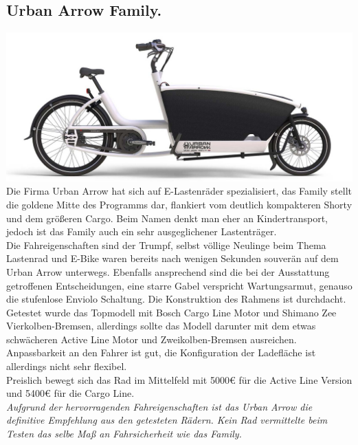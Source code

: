 \documentclass[a4paper,ngerman, 14pt] {scrartcl}
\begin{document}
\subsection{Urban Arrow Family.}
\includegraphics[scale=0.325]{urban_arrow_family.png}\\
Die Firma Urban Arrow hat sich auf E-Lastenräder spezialisiert, das Family stellt die goldene Mitte des Programms dar, flankiert vom deutlich kompakteren Shorty und dem größeren Cargo. Beim Namen denkt man eher an Kindertransport, jedoch ist das Family auch ein sehr ausgeglichener Lastenträger.\\
Die Fahreigenschaften sind der Trumpf, selbst völlige Neulinge beim Thema Lastenrad und E-Bike waren bereits nach wenigen Sekunden souverän auf dem Urban Arrow unterwegs. Ebenfalls ansprechend sind die bei der Ausstattung getroffenen Entscheidungen, eine starre Gabel verspricht Wartungsarmut, genauso die stufenlose Enviolo Schaltung. Die Konstruktion des Rahmens ist durchdacht.\\
Getestet wurde das Topmodell mit Bosch Cargo Line Motor und Shimano Zee Vierkolben-Bremsen, allerdings sollte das Modell darunter mit dem etwas schwächeren Active Line Motor und Zweikolben-Bremsen ausreichen. Anpassbarkeit an den Fahrer ist gut, die Konfiguration der Ladefläche ist allerdings nicht sehr flexibel.\\
Preislich bewegt sich das Rad im Mittelfeld mit 5000€ für die Active Line Version und 5400€ für die Cargo Line.\\
\textit{Aufgrund der hervorragenden Fahreigenschaften ist das Urban Arrow die definitive Empfehlung aus den getesteten Rädern. Kein Rad vermittelte beim Testen das selbe Maß an Fahrsicherheit wie das Family.}
\end{document}
